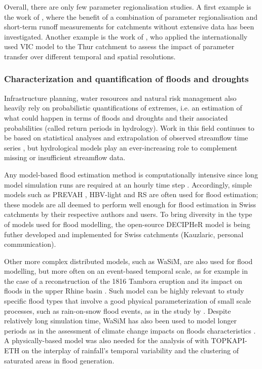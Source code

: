 \documentclass[10pt,a4paper]{article}
\begin{document}
Overall, there are only few parameter regionalisation studies. A first example is the work of \citet{Viviroli2015}, where the benefit of a combination of parameter regionalisation and short-term runoff measurements for catchments without extensive data has been investigated. Another example is the work of \citet{Melsen2016}, who applied the internationally used VIC model to the Thur catchment to assess the impact of parameter transfer over different temporal and spatial resolutions.


\subsubsection{Characterization and quantification of floods and droughts}
\label{sec:application:floodsdroughts}

Infrastructure planning, water resources and natural risk management also heavily rely on probabilistic quantifications of extremes, i.e. an estimation of what could happen in terms of floods and droughts and their associated probabilities (called return periods in hydrology). Work in this field continues to be based on statistical analyses and extrapolation of observed streamflow time series \citep{Brunner2018, Asadi20108}, but hydrological models play an ever-increasing role to complement missing or insufficient streamflow data.

Any model-based flood estimation method is computationally intensive since long model simulation runs are required at an hourly time step \citep[see][about reducing computational requirements for extreme flood estimation by hydrological modelling]{SikorskaSenoner2020}. Accordingly, simple models such as PREVAH \citep{Viviroli2009, Viviroli2009c, Felder2017}, HBV-light \citep{Sikorska2017, Brunner2019a, SikorskaSenoner2020} and  RS \citep{Bieri2013, Zeimetz2017, Zeimetz2018} are often used for flood estimation; these models are all deemed to perform well enough for flood estimation in Swiss catchments by their respective authors and users. To bring diversity in the type of models used for flood modelling, the open-source DECIPHeR model is being futher developed and implemented for Swiss catchments (Kauzlaric, personal communication).

Other more complex distributed models, such as WaSiM, are also used for flood modelling, but more often on an event-based temporal scale, as for example in the case of a reconstruction of the 1816 Tambora eruption and its impact on floods in the upper Rhine basin \citep[see Fig. \ref{fig:map};][]{Rossler2018}. Such model can be highly relevant to study specific flood types that involve a good physical parameterization of small scale processes, such as rain-on-snow flood events, as in the study by \citet{Rossler2014}. Despite relatively long simulation time, WaSiM has also been used to model longer periods as in the assessment of climate change impacts on floods characteristics \citep{Keller2019a}. A physically-based model was also needed for the analysis of \citet{Paschalis2014} with TOPKAPI-ETH on the interplay of rainfall's temporal variability and the clustering of saturated areas in flood generation.
\end{document}

